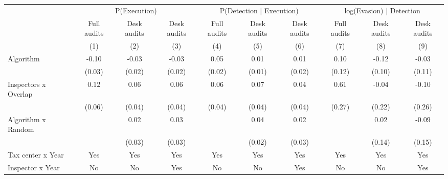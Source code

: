 \begin{tabular}{lccc|ccc|ccc} \toprule
\multicolumn{1}{l}{} & \multicolumn{3}{c}{P(Execution)} & \multicolumn{3}{c}{P(Detection | Execution)} & \multicolumn{3}{c}{log(Evasion) | Detection} \\\cmidrule(lr){2-4}\cmidrule(lr){5-7}\cmidrule(lr){8-10} \multicolumn{1}{l}{} & Full audits & Desk audits & Desk audits & Full audits & Desk audits & Desk audits & Full audits & Desk audits & Desk audits \\ \multicolumn{1}{l}{} & (1) & (2) & (3) & (4) & (5) & (6) & (7) & (8) & (9) \\ \midrule
Algorithm   &       -0.10\sym{***}&       -0.03\sym{*}  &       -0.03\sym{**} &        0.05\sym{**} &        0.01         &        0.01         &        0.10         &       -0.12         &       -0.03         \\
            &      (0.03)         &      (0.02)         &      (0.02)         &      (0.02)         &      (0.01)         &      (0.02)         &      (0.12)         &      (0.10)         &      (0.11)         \\
\addlinespace
Inspectors x Overlap&        0.12\sym{*}  &        0.06\sym{*}  &        0.06         &        0.06\sym{*}  &        0.07\sym{**} &        0.04         &        0.61\sym{**} &       -0.04         &       -0.10         \\
            &      (0.06)         &      (0.04)         &      (0.04)         &      (0.04)         &      (0.04)         &      (0.04)         &      (0.27)         &      (0.22)         &      (0.26)         \\
\addlinespace
Algorithm x Random&                     &        0.02         &        0.03         &                     &        0.04\sym{*}  &        0.02         &                     &        0.02         &       -0.09         \\
            &                     &      (0.03)         &      (0.03)         &                     &      (0.02)         &      (0.03)         &                     &      (0.14)         &      (0.15)         \\
\midrule
Tax center x Year&         Yes         &         Yes         &         Yes         &         Yes         &         Yes         &         Yes         &         Yes         &         Yes         &         Yes         \\
Inspector x Year&          No         &          No         &         Yes         &          No         &          No         &         Yes         &          No         &          No         &         Yes         \\

\end{tabular}
